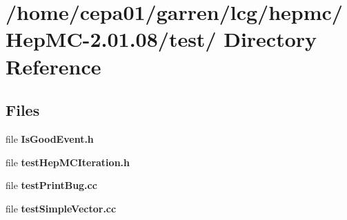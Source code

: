 \section{/home/cepa01/garren/lcg/hepmc/Hep\-MC-2.01.08/test/ Directory Reference}
\label{dir_f428b077ca115b1ca7114151d5ecabe7}
\subsection*{Files}
\begin{CompactItemize}
\item 
file {\bf Is\-Good\-Event.h}
\item 
file {\bf test\-Hep\-MCIteration.h}
\item 
file {\bf test\-Print\-Bug.cc}
\item 
file {\bf test\-Simple\-Vector.cc}
\end{CompactItemize}
